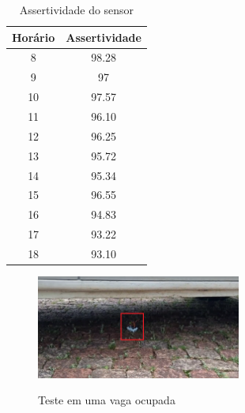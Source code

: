 \documentclass[oneside,openright,12pt]{ufsm_2015} %
\begin{document}
    \begin{table}[ht]
         \centering
         \caption{Assertividade do sensor}
         \begin{tabular}{ c c }
             \hline
              Horário & Assertividade \\ 
             \hline
             8 & 98.28\\
             \hline
             9 & 97\\
             \hline
             10 & 97.57\\
             \hline
             11 & 96.10\\
             \hline
             12 & 96.25\\
             \hline
             13 & 95.72\\
             \hline
             14 & 95.34\\
             \hline
             15 & 96.55\\
             \hline
             16 & 94.83\\
             \hline
             17 & 93.22\\
             \hline
             18 & 93.10\\
             \hline
         \end{tabular}
         \vspace{\baselineskip} %
          \label{table:assertividade-ldr}
    \end{table}
    
    \begin{figure}[ht]
     	    \caption{\label{exepretex} Teste em uma vaga ocupada}
            \centering
            \includegraphics[width=0.6\textwidth]{figuras/ocupada.png}
            \vspace{\baselineskip} %
            \label{fig:ocupada}
    \end{figure}
    
\end{document}
